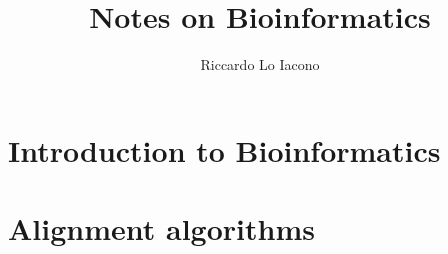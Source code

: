 \documentclass[moon, draft]{lectures2}
\title{Notes on Bioinformatics}
\author{Riccardo Lo Iacono}
\begin{document}
    \maketitle

    \section{Introduction to Bioinformatics}
    

    \section{Alignment algorithms}
    

    \printbibliography
    \printglossaries
    \appendix
    
\end{document}
